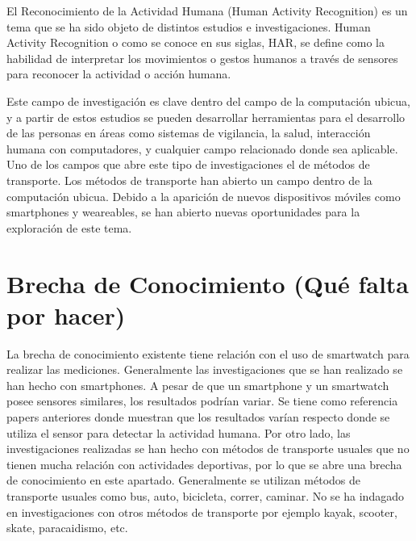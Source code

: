 
El Reconocimiento de la Actividad Humana\cite{Humanactivityrecognition} (Human Activity Recognition) es un tema que se ha sido objeto de distintos estudios e investigaciones. 
Human Activity Recognition o como se conoce en sus siglas, HAR, se define como la habilidad de interpretar los movimientos o gestos humanos a través de sensores para reconocer la actividad o acción humana.\cite{10.1007/s11390-011-9430-9}

Este campo de investigación es clave dentro del campo de la computación ubicua\cite{10.5555/2832747.2832806}, y a partir de estos estudios se pueden desarrollar herramientas para el desarrollo de las personas en áreas como sistemas de vigilancia\cite{10.1007/s11390-011-9430-9}, la salud\cite{10.1145/3195106.3195157}, interacción humana con computadores\cite{10.1007/s11390-011-9430-9}, y cualquier campo relacionado donde sea aplicable. \newline
Uno de los campos que abre este tipo de investigaciones el de métodos de transporte\cite{Efthymiou2019}. Los métodos de transporte han abierto un campo dentro de la computación ubicua. Debido a la aparición de nuevos dispositivos móviles como smartphones y weareables, se han abierto nuevas oportunidades para la exploración de este tema.



\section{Brecha de Conocimiento (Qué falta por hacer)}

La brecha de conocimiento existente tiene relación con el uso de smartwatch para realizar las mediciones. Generalmente las investigaciones que se han realizado se han hecho con smartphones. A pesar de que un smartphone y un smartwatch posee sensores similares, los resultados podrían variar. Se tiene como referencia papers anteriores donde muestran que los resultados varían respecto donde se utiliza el sensor para detectar la actividad humana.
Por otro lado, las investigaciones realizadas se han hecho con métodos de transporte usuales que no tienen mucha relación con actividades deportivas, por lo que se abre una brecha de conocimiento en este apartado. Generalmente se utilizan métodos de transporte usuales como bus, auto, bicicleta, correr, caminar. No se ha indagado en investigaciones con otros métodos de transporte por ejemplo kayak, scooter, skate, paracaidismo, etc. 





